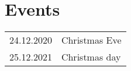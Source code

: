 \chapter{Events}
\begin{tabularx}{\textwidth}{r |@{\linedbullet} X}
    24.12.2020 & Christmas Eve \\
    25.12.2021 & Christmas day \\
\end{tabularx}

